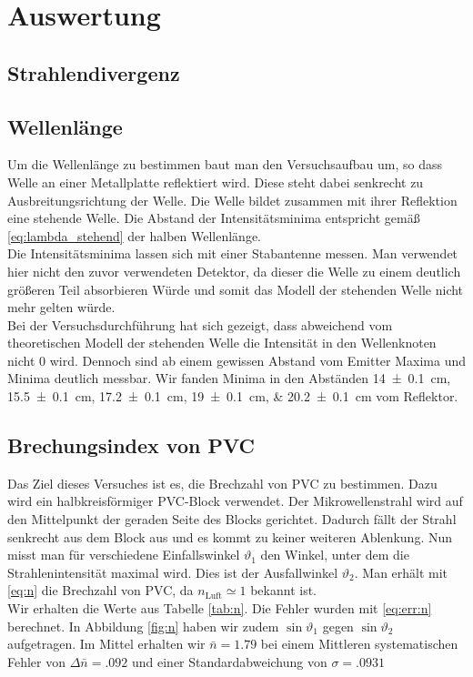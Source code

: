 \newpage
\section{Auswertung}

\subsection{Strahlendivergenz}
\subsection{Wellenlänge}
Um die Wellenlänge zu bestimmen baut man den Versuchsaufbau um, so dass Welle an einer Metallplatte reflektiert wird. Diese steht dabei senkrecht zu Ausbreitungsrichtung der Welle. Die Welle bildet zusammen mit ihrer Reflektion eine stehende Welle. Die Abstand der Intensitätsminima entspricht gemäß \eqref{eq:lambda_stehend} der halben Wellenlänge. \\
Die Intensitätsminima lassen sich mit einer Stabantenne messen. Man verwendet hier nicht den zuvor verwendeten Detektor, da dieser die Welle zu einem deutlich größeren Teil absorbieren Würde und somit das Modell der stehenden Welle nicht mehr gelten würde. \\
Bei der Versuchsdurchführung hat sich gezeigt, dass abweichend vom theoretischen Modell der stehenden Welle die Intensität in den Wellenknoten nicht $ 0 $ wird. Dennoch sind ab einem gewissen Abstand vom Emitter Maxima und Minima deutlich messbar. Wir fanden Minima in den Abständen \SIlist{14+-.1; 15,5+-.1; 17,2+-.1; 19+-.1; 20,2+-.1}{\centi\meter} vom Reflektor.
\subsection{Brechungsindex von PVC}
Das Ziel dieses Versuches ist es, die Brechzahl von PVC zu bestimmen. Dazu wird ein halbkreisförmiger PVC-Block verwendet. Der Mikrowellenstrahl wird auf den Mittelpunkt der geraden Seite des Blocks gerichtet. Dadurch fällt der Strahl senkrecht aus dem Block aus und es kommt zu keiner weiteren Ablenkung. Nun misst man für verschiedene Einfallswinkel $ \vartheta_1 $ den Winkel, unter dem die Strahlenintensität maximal wird. Dies ist der Ausfallwinkel $ \vartheta_2 $. Man erhält mit \eqref{eq:n} die Brechzahl von PVC, da $ n_\mathrm{Luft} \simeq 1 $ bekannt ist.\\
Wir erhalten die Werte aus Tabelle \ref{tab:n}. Die Fehler wurden mit \eqref{eq:err:n} berechnet. In Abbildung \ref{fig:n} haben wir zudem $ \sin\vartheta_1 $ gegen $ \sin\vartheta_2 $ aufgetragen. Im Mittel erhalten wir $ \bar n = \num{1.79} $ bei einem Mittleren systematischen Fehler von $ \Delta \bar n = \num{.092} $ und einer Standardabweichung von $ \sigma = \num{.0931} $

